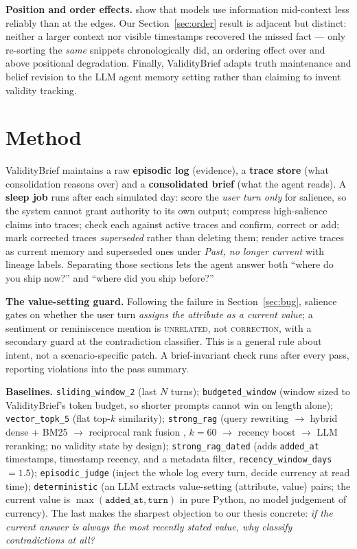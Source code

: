 \documentclass{article}
\newcommand{\sysname}{ValidityBrief}
\begin{document}
\textbf{Position and order effects.} \citet{liu2024lost} show that models use information mid-context less reliably than at the edges. Our Section~\ref{sec:order} result is adjacent but distinct: neither a larger context nor visible timestamps recovered the missed fact --- only re-sorting the \emph{same} snippets chronologically did, an ordering effect over and above positional degradation. Finally, \sysname{} adapts truth maintenance \citep{doyle1979tms} and belief revision \citep{agm1985} to the LLM agent memory setting rather than claiming to invent validity tracking.

\section{Method}

\sysname{} maintains a raw \textbf{episodic log} (evidence), a \textbf{trace store} (what consolidation reasons over) and a \textbf{consolidated brief} (what the agent reads). A \textbf{sleep job} runs after each simulated day: score the \emph{user turn only} for salience, so the system cannot grant authority to its own output; compress high-salience claims into traces; check each against active traces and confirm, correct or add; mark corrected traces \emph{superseded} rather than deleting them; render active traces as current memory and superseded ones under \emph{Past, no longer current} with lineage labels. Separating those sections lets the agent answer both ``where do you ship now?'' and ``where did you ship before?''

\textbf{The value-setting guard.} Following the failure in Section~\ref{sec:bug}, salience gates on whether the user turn \emph{assigns the attribute as a current value}; a sentiment or reminiscence mention is \textsc{unrelated}, not \textsc{correction}, with a secondary guard at the contradiction classifier. This is a general rule about intent, not a scenario-specific patch. A brief-invariant check runs after every pass, reporting violations into the pass summary.

\textbf{Baselines.} \texttt{sliding\_window\_2} (last $N$ turns); \texttt{budgeted\_window} (window sized to \sysname{}'s token budget, so shorter prompts cannot win on length alone); \texttt{vector\_topk\_5} (flat top-$k$ similarity); \texttt{strong\_rag} (query rewriting $\rightarrow$ hybrid dense + BM25 $\rightarrow$ reciprocal rank fusion \citep{cormack2009rrf}, $k{=}60$ $\rightarrow$ recency boost $\rightarrow$ LLM reranking; no validity state by design); \texttt{strong\_rag\_dated} (adds \texttt{added\_at} timestamps, timestamp recency, and a metadata filter, \texttt{recency\_window\_days}${=}1.5$); \texttt{episodic\_judge} (inject the whole log every turn, decide currency at read time); \texttt{deterministic} (an LLM extracts value-setting (attribute, value) pairs; the current value is $\max(\texttt{added\_at}, \texttt{turn})$ in pure Python, no model judgement of currency). The last makes the sharpest objection to our thesis concrete: \emph{if the current answer is always the most recently stated value, why classify contradictions at all?}
\end{document}
